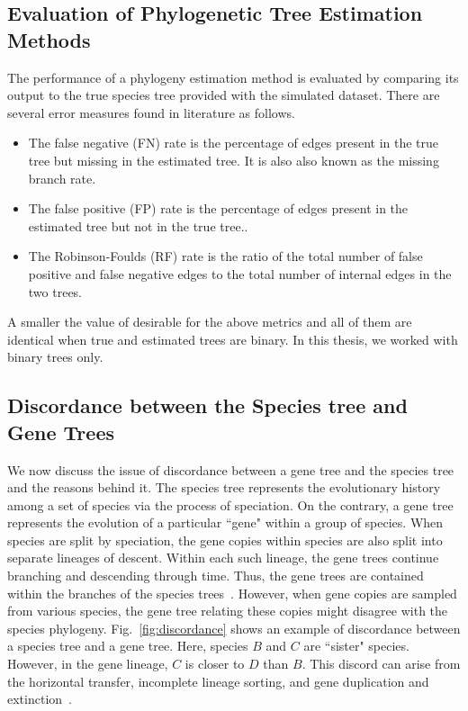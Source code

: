 \subsection{Evaluation of Phylogenetic Tree Estimation Methods}\label{sec:phyPerf}
The performance of a phylogeny estimation method is evaluated by comparing its output to the true species tree provided with the simulated dataset. There are several error measures found in literature as follows.

\begin{itemize}
	\item The false negative (FN) rate is the percentage of edges present in the true tree but missing in the estimated tree. It is also also known as the missing branch rate.
	\item The false positive (FP) rate is the percentage of edges present in the estimated tree but not in the true tree..
	\item The Robinson-Foulds (RF) rate is the ratio of
the total number of false positive and false negative edges to the total number
	of internal edges in the two trees.
\end{itemize}

A smaller the value of desirable for the above metrics and all of them are identical when true and estimated trees are binary\citep{warnow2017computational}. In this thesis, we worked with binary trees only.


\subsection{Discordance between the Species tree and Gene Trees}%
We now discuss the issue of discordance between a gene tree and the species tree and the reasons behind it. The species tree represents the evolutionary history among a set of species via the process of speciation. On the contrary, a gene tree represents the evolution of a particular ``gene" within a group of species. When species are split by speciation, the gene copies within species are also split into separate lineages of descent.  Within each such lineage, the gene trees continue branching and descending through time. Thus, the gene trees are contained within the branches of the species trees~\cite{maddison1997gene}.
However, when gene copies are sampled from various species, the gene tree relating these copies might disagree with the species phylogeny. Fig.~\ref{fig:discordance} shows an example of discordance between a species tree and a gene tree. Here, species $B$ and $C$ are ``sister" species. However, in the gene lineage, $C$ is closer to $D$ than $B$. This discord can arise from the horizontal transfer, incomplete lineage sorting, and gene duplication and extinction~\cite{maddison1997gene}. 

